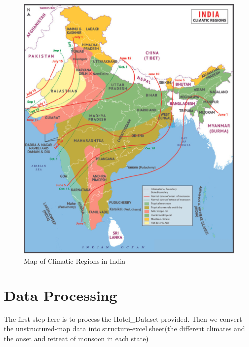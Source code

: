 \documentclass{report}
\begin{document}
\begin{Center}
  \begin{figure}[h!]
    \includegraphics[width=1\textwidth]{map.png}
    \caption{Map of Climatic Regions in India}
   \end{figure}
 \end{Center}
\section{Data Processing}
The first step here is to process the Hotel\_Dataset provided. Then we convert the unstructured-map data into structure-excel sheet(the different climates and the onset and retreat of monsoon in each state).
 \newpage
\end{document}
